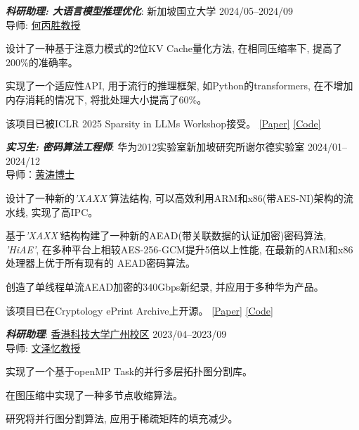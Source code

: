 \documentclass[10pt]{article}
\newenvironment{outerlist}[1][\enskip\textbullet]%
        {%
        \begin{itemize}[label=#1, itemsep=1pt]}{\end{itemize}%
         \vspace{-0.6\baselineskip}}
\newenvironment{innerlist}[1][\enskip$\circ$]%
        {\begin{compactitem}[#1]}{\end{compactitem}}
\begin{document}
\begin{outerlist}
\item {\it\textbf{科研助理: 大语言模型推理优化}}: 新加坡国立大学 \hfill 2024/05--2024/09\\
        导师: \href{https://www.comp.nus.edu.sg/~hebs/}{何丙胜教授}
        \begin{innerlist}
                \item 设计了一种基于注意力模式的2位KV Cache量化方法, 在相同压缩率下, 提高了200\%的准确率。
                \item 实现了一个适应性API, 用于流行的推理框架, 如Python的transformers, 在不增加内存消耗的情况下, 将批处理大小提高了60\%。
                \item 该项目已被ICLR 2025 Sparsity in LLMs Workshop接受。 \href{https://www.researchgate.net/publication/388733634_LogQuant_Log-Distributed_2-Bit_Quantization_of_KV_Cache_with_Superior_Accuracy_Preservation}{[Paper]} \href{www.github.com/Concyclics/LogQuantKV}{[Code]}
        \end{innerlist}

\item {\it\textbf{实习生: 密码算法工程师}}: 华为2012实验室新加坡研究所谢尔德实验室 \hfill 2024/01--2024/12\\
        导师：\href{mailto:huangtao80@huawei.com}{黄涛博士}
        \begin{innerlist}
                \item 设计了一种新的\textit{'XAXX'}算法结构, 可以高效利用ARM和x86(带AES-NI)架构的流水线, 实现了高IPC。
                \item 基于\textit{'XAXX'}结构构建了一种新的AEAD(带关联数据的认证加密)密码算法, \textit{'HiAE'}, 在多种平台上相较AES-256-GCM提升5倍以上性能, 在最新的ARM和x86处理器上优于所有现有的 AEAD密码算法。
                \item 创造了单线程单流AEAD加密的340Gbps新纪录, 并应用于多种华为产品。
                \item 该项目已在Cryptology ePrint Archive上开源。 \href{https://eprint.iacr.org/2025/377}{[Paper]} \href{www.github.com/Concyclics/HiAE}{[Code]}
        \end{innerlist}

 \item {\it\textbf{科研助理}}: \href{https://hkust-gz.edu.cn/zh/?variant=zh-cn}{香港科技大学广州校区} \hfill 2023/04--2023/09\\
        导师: \href{https://zeyiwen.github.io/}{文泽忆教授}
        \begin{innerlist}
                \item 实现了一个基于openMP Task的并行多层拓扑图分割库。
                \item 在图压缩中实现了一种多节点收缩算法。
                \item 研究将并行图分割算法, 应用于稀疏矩阵的填充减少。
        \end{innerlist}
 	

\end{outerlist}
\end{document}
